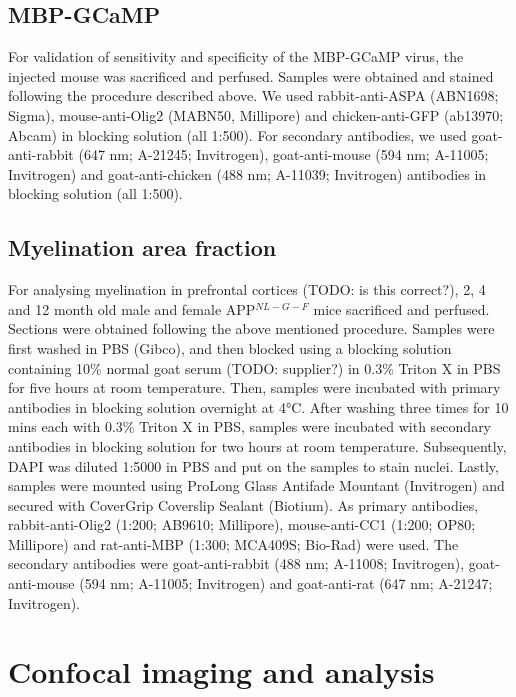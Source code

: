 \subsection{MBP-GCaMP}
For validation of sensitivity and specificity of the MBP-GCaMP virus, the injected mouse was sacrificed and perfused. Samples were obtained and stained following the procedure described above. We used rabbit-anti-ASPA (ABN1698; Sigma), mouse-anti-Olig2 (MABN50, Millipore) and chicken-anti-GFP (ab13970; Abcam) in blocking solution (all 1:500). For secondary antibodies, we used goat-anti-rabbit (647 nm; A-21245; Invitrogen), goat-anti-mouse (594 nm; A-11005; Invitrogen) and goat-anti-chicken (488 nm; A-11039; Invitrogen) antibodies in blocking solution (all 1:500).
\subsection{Myelination area fraction}
For analysing myelination in prefrontal cortices (TODO: is this correct?), 2, 4 and 12 month old male and female APP$^{NL-G-F}$ mice sacrificed and perfused. Sections were obtained following the above mentioned procedure. Samples were first washed in PBS (Gibco), and then blocked using a blocking solution containing 10\% normal goat serum (TODO: supplier?) in 0.3\% Triton X in PBS for five hours at room temperature. Then, samples were incubated with primary antibodies in blocking solution overnight at 4°C. After washing three times for 10 mins each with 0.3\% Triton X in PBS, samples were incubated with secondary antibodies in blocking solution for two hours at room temperature. Subsequently, DAPI was diluted 1:5000 in PBS and put on the samples to stain nuclei.
Lastly, samples were mounted using ProLong Glass Antifade Mountant (Invitrogen) and secured with CoverGrip Coverslip Sealant (Biotium).
As primary antibodies, rabbit-anti-Olig2 (1:200; AB9610; Millipore), mouse-anti-CC1 (1:200; OP80; Millipore) and rat-anti-MBP (1:300; MCA409S; Bio-Rad) were used.
The secondary antibodies were goat-anti-rabbit (488 nm; A-11008; Invitrogen), goat-anti-mouse (594 nm; A-11005; Invitrogen) and goat-anti-rat (647 nm; A-21247; Invitrogen).
\section{Confocal imaging and analysis}
